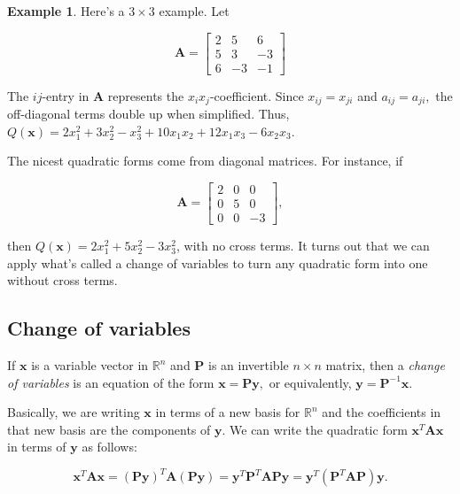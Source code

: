 \documentclass[
]{book}
\theoremstyle{definition}
\theoremstyle{definition}
\newtheorem{example}{Example}[chapter]
\theoremstyle{definition}
\theoremstyle{definition}
\theoremstyle{remark}
\begin{document}
\begin{examplebox}

\begin{example}
Here's a \(3\times 3\) example. Let

\[\mathbf{A}=\begin{bmatrix} 2 & 5 & 6\\5 & 3 & -3\\6 & -3 & -1\end{bmatrix}\]

The \(ij\)-entry in \(\mathbf{A}\) represents the \(x_ix_j\)-coefficient. Since \(x_{ij}=x_{ji}\) and \(a_{ij}=a_{ji},\) the off-diagonal terms double up when simplified. Thus, \(Q(\mathbf{x})=2x_1^2+3x_2^2-x_3^2+10x_1x_2+12x_1x_3-6x_2x_3.\)
\end{example}

\end{examplebox}

The nicest quadratic forms come from diagonal matrices. For instance, if

\[\mathbf{A}=\begin{bmatrix}2 & 0 & 0\\0 & 5 & 0\\0 & 0 & -3\end{bmatrix},\]

then \(Q(\mathbf{x})=2x_1^2+5x_2^2-3x_3^2\), with no cross terms.
It turns out that we can apply what's called a change of variables to turn any quadratic form into one without cross terms.

\subsection*{Change of variables}\label{change-of-variables}

If \(\mathbf{x}\) is a variable vector in \(\mathbb{R}^n\) and \(\mathbf{P}\) is an invertible \(n\times n\) matrix, then a \emph{change of variables} is an equation of the form
\(\mathbf{x}=\mathbf{P}\mathbf{y},\) or equivalently, \(\mathbf{y}=\mathbf{P}^{-1}\mathbf{x}.\)

Basically, we are writing \(\mathbf{x}\) in terms of a new basis for \(\mathbb{R}^n\) and the coefficients in that new basis are the components of \(\mathbf{y}.\) We can write the quadratic form \(\mathbf{x}^T\mathbf{A}\mathbf{x}\) in terms of \(\mathbf{y}\) as follows:

\[\mathbf{x}^T\mathbf{A}\mathbf{x}=(\mathbf{P}\mathbf{y})^T\mathbf{A}(\mathbf{P}\mathbf{y})=\mathbf{y}^T\mathbf{P}^T\mathbf{A}\mathbf{P}\mathbf{y}=\mathbf{y}^T(\mathbf{P}^T\mathbf{A}\mathbf{P})\mathbf{y}.\]
\end{document}
